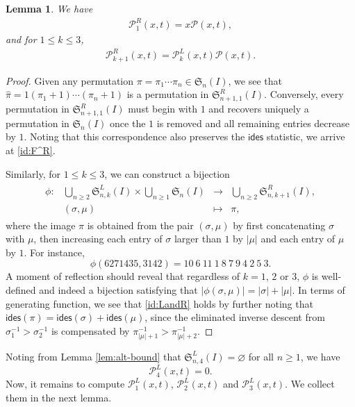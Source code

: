 \documentclass[reqno]{amsart}
\numberwithin{equation}{section}
\theoremstyle{plain}
\newtheorem{lemma}[theorem]{Lemma}
\theoremstyle{definition}
\theoremstyle{named}
\newcommand{\fS}{\mathfrak{S}}
\newcommand{\ides}{\mathsf{ides}}
\newcommand{\cP}{\mathcal{P}}
\begin{document}
\begin{lemma}\label{lem:LandR}
	We have
	\begin{align}\label{id:F^R}
		\cP_1^R(x,t)=x\cP(x,t),
	\end{align} 
	and for $1\le k\le 3$, 
	\begin{align}\label{id:LandR}
		\cP_{k+1}^R(x,t)=\cP_{k}^L(x,t)\cP(x,t).
	\end{align}
\end{lemma}

\begin{proof}
	Given any permutation $\pi=\pi_1\cdots\pi_n\in\fS_n(I)$, we see that $\hat{\pi}=1(\pi_1+1)\cdots(\pi_n+1)$ is a permutation in $\fS_{n+1,1}^R(I)$. Conversely, every permutation in $\fS_{n+1,1}^R(I)$ must begin with $1$ and recovers uniquely a permutation in $\fS_n(I)$ once the $1$ is removed and all remaining entries decrease by $1$. Noting that this correspondence also preserves the $\ides$ statistic, we arrive at \eqref{id:F^R}.
	
	Similarly, for $1\le k\le 3$, we can construct a bijection 
	\begin{align*}
		\begin{array}{cccc}
			\phi: & \bigcup_{n\ge 2}\fS_{n,k}^L(I)\times\bigcup_{n\ge 1}\fS_{n}(I) & \to & \bigcup_{n\ge 2}\fS_{n,k+1}^R(I),\\[6pt]
			& (\sigma,\mu) & \mapsto & \pi,
		\end{array}
	\end{align*}
	where the image $\pi$ is obtained from the pair $(\sigma,\mu)$ by first concatenating $\sigma$ with $\mu$, then increasing each entry of $\sigma$ larger than $1$ by $|\mu|$ and each entry of $\mu$ by $1$. For instance, 
	$$\phi(6271435,3142)=10\:6\:11\:1\:8\:7\:9\:4\:2\:5\:3.$$
	A moment of reflection should reveal that regardless of $k=1$, $2$ or $3$, $\phi$ is well-defined and indeed a bijection satisfying that $|\phi(\sigma,\mu)|=|\sigma|+|\mu|$. In terms of generating function, we see that \eqref{id:LandR} holds by further noting that $\ides(\pi)=\ides(\sigma)+\ides(\mu)$, since the eliminated inverse descent from $\sigma_1^{-1}>\sigma_2^{-1}$ is compensated by $\pi_{|\mu|+1}^{-1}>\pi_{|\mu|+2}^{-1}$.
\end{proof}

Noting from Lemma \ref{lem:alt-bound} that $\fS_{n,4}^L(I)=\varnothing$ for all $n\ge 1$, we have
\begin{equation}
	\cP_{4}^L(x,t)=0.
\end{equation}
Now, it remains to compute $\cP_1^L(x,t)$, $\cP_2^L(x,t)$ and $\cP_3^L(x,t)$. We collect them in the next lemma.
\end{document}
